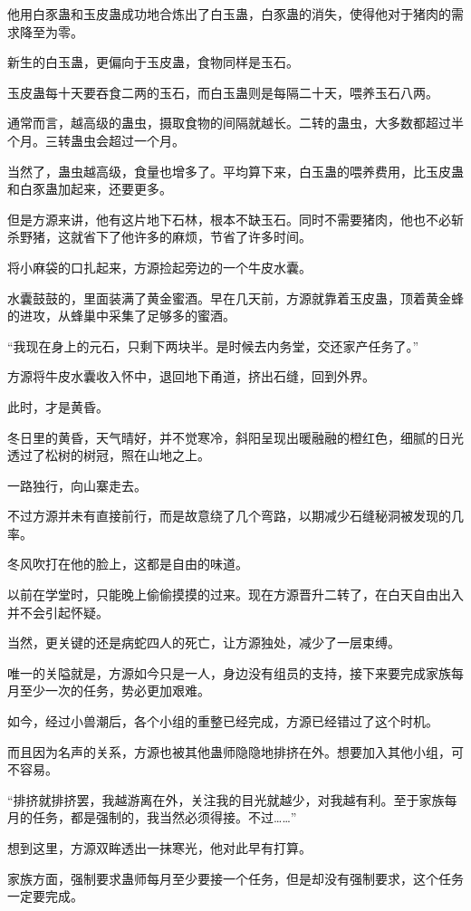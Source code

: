 \begin{this_body}
他用白豕蛊和玉皮蛊成功地合炼出了白玉蛊，白豕蛊的消失，使得他对于猪肉的需求降至为零。

新生的白玉蛊，更偏向于玉皮蛊，食物同样是玉石。

玉皮蛊每十天要吞食二两的玉石，而白玉蛊则是每隔二十天，喂养玉石八两。

通常而言，越高级的蛊虫，摄取食物的间隔就越长。二转的蛊虫，大多数都超过半个月。三转蛊虫会超过一个月。

当然了，蛊虫越高级，食量也增多了。平均算下来，白玉蛊的喂养费用，比玉皮蛊和白豕蛊加起来，还要更多。

但是方源来讲，他有这片地下石林，根本不缺玉石。同时不需要猪肉，他也不必斩杀野猪，这就省下了他许多的麻烦，节省了许多时间。

将小麻袋的口扎起来，方源捡起旁边的一个牛皮水囊。

水囊鼓鼓的，里面装满了黄金蜜酒。早在几天前，方源就靠着玉皮蛊，顶着黄金蜂的进攻，从蜂巢中采集了足够多的蜜酒。

“我现在身上的元石，只剩下两块半。是时候去内务堂，交还家产任务了。”

方源将牛皮水囊收入怀中，退回地下甬道，挤出石缝，回到外界。

此时，才是黄昏。

冬日里的黄昏，天气晴好，并不觉寒冷，斜阳呈现出暖融融的橙红色，细腻的日光透过了松树的树冠，照在山地之上。

一路独行，向山寨走去。

不过方源并未有直接前行，而是故意绕了几个弯路，以期减少石缝秘洞被发现的几率。

冬风吹打在他的脸上，这都是自由的味道。

以前在学堂时，只能晚上偷偷摸摸的过来。现在方源晋升二转了，在白天自由出入并不会引起怀疑。

当然，更关键的还是病蛇四人的死亡，让方源独处，减少了一层束缚。

唯一的关隘就是，方源如今只是一人，身边没有组员的支持，接下来要完成家族每月至少一次的任务，势必更加艰难。

如今，经过小兽潮后，各个小组的重整已经完成，方源已经错过了这个时机。

而且因为名声的关系，方源也被其他蛊师隐隐地排挤在外。想要加入其他小组，可不容易。

“排挤就排挤罢，我越游离在外，关注我的目光就越少，对我越有利。至于家族每月的任务，都是强制的，我当然必须得接。不过……”

想到这里，方源双眸透出一抹寒光，他对此早有打算。

家族方面，强制要求蛊师每月至少要接一个任务，但是却没有强制要求，这个任务一定要完成。


\end{this_body}

